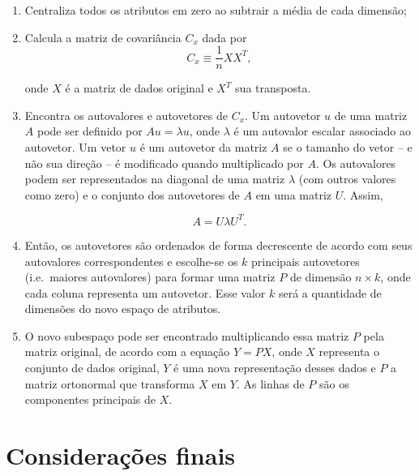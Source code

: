 \begin{enumerate}
\item Centraliza todos os atributos em zero ao subtrair a média de cada dimensão;
\item Calcula a matriz de covariância $C_x$ dada por
\begin{equation}
    C_x \equiv \frac{1}{n} X X^T,
\end{equation}

\noindent onde $X$ é a matriz de dados original e $X^T$ sua transposta.

\item Encontra os autovalores e autovetores de $C_x$. Um autovetor $u$ de uma matriz $A$ pode ser definido por $Au = \lambda u$, onde $\lambda$ é um autovalor escalar associado ao autovetor. Um vetor $u$ é um autovetor da matriz $A$ se o tamanho do vetor -- e não sua direção -- é modificado quando multiplicado por $A$. Os autovalores podem ser representados na diagonal de uma matriz $\lambda$ (com outros valores como zero) e o conjunto dos autovetores de $A$ em uma matriz $U$. Assim,

\begin{equation}
    A = U \lambda U^T.
\end{equation}

\item Então, os autovetores são ordenados de forma decrescente de acordo com seus autovalores correspondentes e escolhe-se os $k$ principais autovetores (i.e.\ maiores autovalores) para formar uma matriz $P$ de dimensão $n \times k$, onde cada coluna representa um autovetor. Esse valor $k$ será a quantidade de dimensões do novo espaço de atributos.
\item O novo subespaço pode ser encontrado multiplicando essa matriz $P$ pela matriz original, de acordo com a equação $Y = PX$, onde $X$ representa o conjunto de dados original, $Y$ é uma nova representação desses dados e $P$ a matriz ortonormal que transforma $X$ em $Y$. As linhas de $P$ são os componentes principais de $X$.
\end{enumerate}

\section{Considerações finais}

